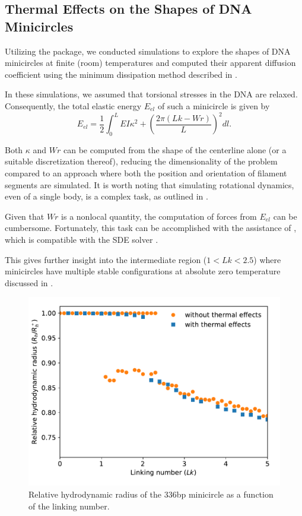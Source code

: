 \documentclass{doctoral}
\newcommand{\code}[1]{\texttt{\detokenize{#1}}}
\begin{document}
\subsection{Thermal Effects on the Shapes of DNA Minicircles}

Utilizing the \code{pychastic} package, we conducted simulations to explore the shapes of DNA minicircles at finite (room) temperatures and computed their apparent diffusion coefficient using the minimum dissipation method described in \textcite{Cichocki_2019}.

In these simulations, we assumed that torsional stresses in the DNA are relaxed. Consequently, the total elastic energy $E_{el}$ of such a minicircle is given by
\begin{equation}
E_{el} = \frac{1}{2} \int_0^L EI \kappa^2 + \left( \frac{2\pi (Lk - Wr)}{L} \right)^2 dl.
\end{equation}

Both $\kappa$ and $Wr$ can be computed from the shape of the centerline alone (or a suitable discretization thereof), reducing the dimensionality of the problem compared to an approach where both the position and orientation of filament segments are simulated. It is worth noting that simulating rotational dynamics, even of a single body, is a complex task, as outlined in \textcite{Waszkiewicz_2023_pychastic}.

Given that $Wr$ is a nonlocal quantity, the computation of forces from $E_{el}$ can be cumbersome. Fortunately, this task can be accomplished with the assistance of \code{jax.grad}, which is compatible with the SDE solver \code{pychastic}.

This gives further insight into the intermediate region ($1 < Lk < 2.5$) where minicircles have multiple stable configurations at absolute zero temperature discussed in \textcite{Waszkiewicz_2023_dna}. 

\begin{figure}[htbp]
    \centering
    \includegraphics[height=0.5\linewidth]{figures/with_thermal_effects.pdf}
    \caption{Relative hydrodynamic radius of the 336bp minicircle as a function of the linking number.}
    \label{fig:thermalized_loops}
\end{figure}
\end{document}
